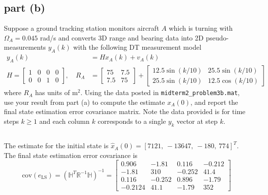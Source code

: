 \documentclass[11pt]{article}
\begin{document}
\subsection*{part (b)}
Suppose a ground tracking station monitors aircraft $A$ which is turning with $\Omega_A=0.045$ rad/s and converts 3D range and bearing data into 2D pseudo-measurements $y_A(k)$ with the following DT measurement model
\begin{align*}
	y_A(k) &= Hx_A(k)+v_A(k) \\
	H = \begin{bmatrix} 1&0&0&0\\0&0&1&0 \end{bmatrix},\quad R_A &= \begin{bmatrix} 75&7.5\\7.5&75 \end{bmatrix} + \begin{bmatrix} 12.5\sin(k/10) & 25.5\sin(k/10) \\ 25.5\sin(k/10) & 12.5\cos(k/10) \end{bmatrix}
\end{align*}
where $R_A$ has units of $\text{m}^2$. Using the data posted in \texttt{midterm2\_problem3b.mat}, use your result from part (a) to compute the estimate $x_A(0)$, and report the final state estimation error covariance matrix. Note the data provided is for time steps $k\geq1$ and each column $k$ corresponds to a single $y_k$ vector at step $k$.

\subsection*{}
The estimate for the initial state is $\hat{x}_A(0) = [7121,\ -13647,\ -180,\ 774]^T$. The final state estimation error covariance is 
\begin{equation*}
	\text{cov}(e_\text{LS})=(\mathbb{H}^T\mathbb{R}^{-1}\mathbb{H})^{-1} = \begin{bmatrix} 0.906&-1.81&0.116&-0.212 \\ -1.81&310&-0.252&41.4 \\ 0.116&-0.252&0.896&-1.79 \\ -0.2124&41.1&-1.79&352 \end{bmatrix}
\end{equation*}
\end{document}
